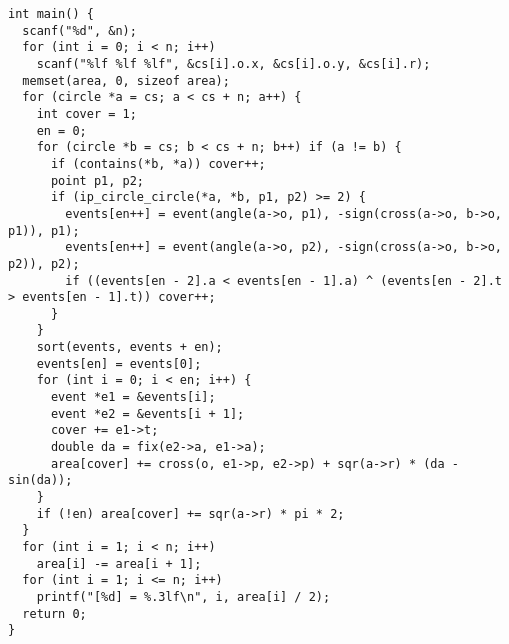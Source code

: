 \begin{verbatim}
int main() {
  scanf("%d", &n);
  for (int i = 0; i < n; i++)
    scanf("%lf %lf %lf", &cs[i].o.x, &cs[i].o.y, &cs[i].r);
  memset(area, 0, sizeof area);
  for (circle *a = cs; a < cs + n; a++) {
    int cover = 1;
    en = 0;
    for (circle *b = cs; b < cs + n; b++) if (a != b) {
      if (contains(*b, *a)) cover++;
      point p1, p2;
      if (ip_circle_circle(*a, *b, p1, p2) >= 2) {
        events[en++] = event(angle(a->o, p1), -sign(cross(a->o, b->o, p1)), p1);
        events[en++] = event(angle(a->o, p2), -sign(cross(a->o, b->o, p2)), p2);
        if ((events[en - 2].a < events[en - 1].a) ^ (events[en - 2].t > events[en - 1].t)) cover++;
      }
    }
    sort(events, events + en);
    events[en] = events[0];
    for (int i = 0; i < en; i++) {
      event *e1 = &events[i];
      event *e2 = &events[i + 1];
      cover += e1->t;
      double da = fix(e2->a, e1->a);
      area[cover] += cross(o, e1->p, e2->p) + sqr(a->r) * (da - sin(da));
    }
    if (!en) area[cover] += sqr(a->r) * pi * 2;
  }
  for (int i = 1; i < n; i++)
    area[i] -= area[i + 1];
  for (int i = 1; i <= n; i++)
    printf("[%d] = %.3lf\n", i, area[i] / 2);
  return 0;
}
\end{verbatim}
